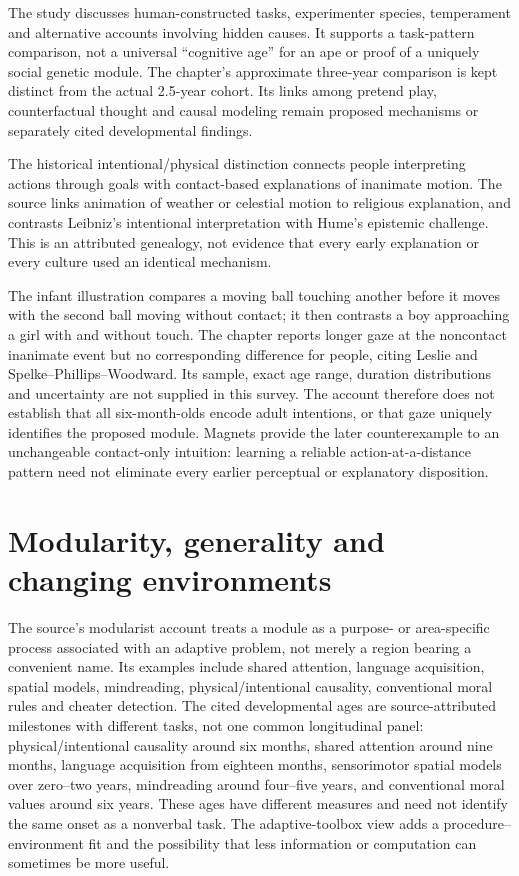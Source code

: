 The study discusses human-constructed tasks, experimenter species,
temperament and alternative accounts involving hidden causes. It supports
a task-pattern comparison, not a universal ``cognitive age'' for an ape or
proof of a uniquely social genetic module. The chapter's approximate
three-year comparison is kept distinct from the actual 2.5-year cohort.
Its links among pretend play, counterfactual thought and causal modeling
remain proposed mechanisms or separately cited developmental findings.

The historical intentional/physical distinction connects people interpreting
actions through goals with contact-based explanations of inanimate motion.
The source links animation of weather or celestial motion to religious
explanation, and contrasts Leibniz's intentional interpretation with Hume's
epistemic challenge. This is an attributed genealogy, not evidence that
every early explanation or every culture used an identical mechanism.

The infant illustration compares a moving ball touching another before it
moves with the second ball moving without contact; it then contrasts a boy
approaching a girl with and without touch. The chapter reports longer gaze
at the noncontact inanimate event but no corresponding difference for people,
citing Leslie and Spelke--Phillips--Woodward. Its sample, exact age range,
duration distributions and uncertainty are not supplied in this survey.
The account therefore does not establish that all six-month-olds encode
adult intentions, or that gaze uniquely identifies the proposed module.
Magnets provide the later counterexample to an unchangeable contact-only
intuition: learning a reliable action-at-a-distance pattern need not
eliminate every earlier perceptual or explanatory disposition.

\section{Modularity, generality and changing environments}
\label{sec:p19-r13-modularity}

The source's modularist account treats a module as a purpose- or area-specific
process associated with an adaptive problem, not merely a region bearing
a convenient name. Its examples include shared attention, language
acquisition, spatial models, mindreading, physical/intentional causality,
conventional moral rules and cheater detection. The cited developmental
ages are source-attributed milestones with different tasks, not one common
longitudinal panel: physical/intentional causality around six months, shared
attention around nine months, language acquisition from eighteen months,
sensorimotor spatial models over zero--two years, mindreading around
four--five years, and conventional moral values around six years. These ages
have different measures and need not identify the same onset as a nonverbal
task. The adaptive-toolbox view adds a procedure--environment
fit and the possibility that less information or computation can sometimes
be more useful.


